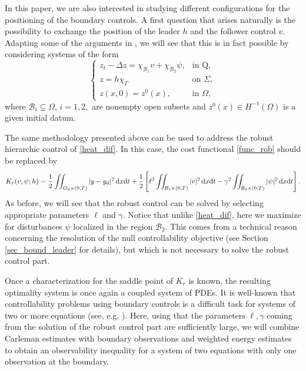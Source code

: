 \documentclass[preprint,10pt]{article}
\numberwithin{equation}{section}
\numberwithin{theorem}{section}
\def\dx{\,\textnormal{d}x}
\def\dt{\textnormal{d}t}
\newcommand\csin[1]{\chi_{#1}}
\def\dx{\,\textnormal{d}x}
\def\dt{\textnormal{d}t}
\begin{document}
{In this paper, we are also interested in studying different configurations for the positioning of the boundary controls. A first question that arises naturally is the possibility to exchange the position of the leader $h$ and the follower control $v$. Adapting some of the arguments in \cite{da_silva}, we will see that this is in fact possible by considering systems of the form 
%
\begin{equation}\label{heat_dif}
\begin{cases}
z_t-\Delta z=\csin{\mathcal B_1}v+\csin{\mathcal B_2}\psi, & \text{in Q}, \\
z=h\csin{\Gamma} &\text{on } \Sigma, \\
z(x,0)=z^0(x), & \text{in } \Omega,
\end{cases}
\end{equation}
%
where {$\mathcal B_i \subsetneq \Omega$}, $i=1,2,$ are nonempty open subsets and ${z^0(x)\in H^{-1}(\Omega)}$ is a given initial datum. 

The same methodology presented above can be used to address the robust hierarchic control of \eqref{heat_dif}. In this case, the cost functional \eqref{func_rob} should be replaced by 
%
\begin{equation}\label{func_rob_dif}
K_r(v,\psi;h)=\frac{1}{2}\iint_{\mathcal O_d\times(0,T)}|y-y_d|^2\dx\dt+\frac{1}{2}\left[\ell^2\iint_{\mathcal B_1\times(0,T)}|v|^2\dx\dt-\gamma^2\iint_{\mathcal B_2\times(0,T)}|\psi|^2\dx\dt\right].
\end{equation}
%
As before, we will see that the robust control can be solved by selecting appropriate parameters $\ell$ and $\gamma$. Notice that unlike \eqref{heat_dif}, here we maximize for disturbances $\psi$ localized in the region $\mathcal B_2$. This comes from a technical reason concerning the resolution of the null controllability objective (see Section {\ref{sec_bound_leader}} for details), but which is not necessary to solve the robust control part. 

Once a characterization for the saddle point of $K_r$ is known, the resulting optimality system is once again a coupled system of PDEs. It is well-known that controllability problems using boundary controls is a difficult task for systems of two or more equations (see, e.g, \cite{assia_survey,assia_luz_new}). Here,  using that the parameters $\ell,\gamma$ coming from the solution of the robust control part are sufficiently large, we will combine Carleman estimates with boundary observations and weighted energy estimates to obtain an observability inequality for a system of two equations with only one observation at the boundary.

}
\end{document}
